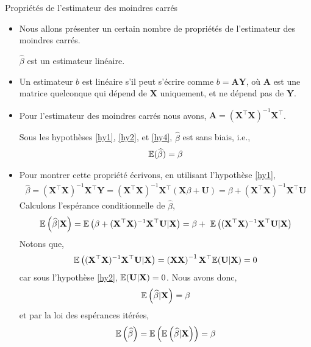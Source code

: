 \begin{frame}[allowframebreaks]{Propriétés de l'estimateur des moindres carrés}
\begin{itemize}
\item Nous allons présenter un certain nombre de propriétés de l'estimateur des moindres carrés.
\begin{proposition}$\widehat{\beta}$ est un estimateur linéaire.
\end{proposition}

\item Un estimateur $b$ est linéaire s'il peut s'écrire comme $b=\mathbf{A}\mathbf{Y}$, où $\mathbf{A}$ est une matrice quelconque qui dépend de $\mathbf{X}$ uniquement, et ne dépend pas de $\mathbf{Y}$.
\item  Pour l'estimateur des moindres carrés nous avons, $\mathbf{A} = (\mathbf{X}^\top\mathbf{X})^{-1}\mathbf{X}^\top$.

\begin{proposition}
Sous les hypothèses \ref{hy1}, \ref{hy2}, et \ref{hy4}, $\widehat{\beta}$ est sans biais, i.e.,
\begin{align*}
\mathbb{E}(\widehat{\beta}) = \beta
\end{align*}
\end{proposition}

\item Pour montrer cette propriété écrivons, en utilisant l'hypothèse \ref{hy1},
\begin{align*}
\widehat{\beta} = (\mathbf{X}^\top\mathbf{X})^{-1}\mathbf{X}^\top\mathbf{Y} =  (\mathbf{X}^\top\mathbf{X})^{-1}\mathbf{X}^\top (\mathbf{X}\beta + \mathbf{U}) = 
\beta + (\mathbf{X}^\top\mathbf{X})^{-1}\mathbf{X}^\top\mathbf{U}
\end{align*}
Calculons l'espérance conditionnelle de $\widehat{\beta}$,
\begin{align*}
\Er\left(\widehat{\beta} | \mathbf{X}\right) = \Er\left(\beta + (\mathbf{X}^\top\mathbf{X})^{-1}\mathbf{X}^\top\mathbf{U} | \mathbf{X}\right) = \beta +\ \Er\left((\mathbf{X}^\top\mathbf{X})^{-1}\mathbf{X}^\top\mathbf{U} | \mathbf{X}\right)
\end{align*}
Notons que,
\begin{align*}
\mathbb{E}\left((\mathbf{X}^\top\mathbf{X})^{-1}\mathbf{X}^\top\mathbf{U} | \mathbf{X}\right) = 
\left(\mathbf{X}\mathbf{X}\right)^{-1}\mathbf{X}^\top\mathbb{E}(\mathbf{U}|\mathbf{X}) = 0
\end{align*} 
car sous l'hypothèse \ref{hy2}, $\mathbb{E}(\mathbf{U}|\mathbf{X}) = 0$. Nous avons donc,
\begin{align}
\mathbb{E}\left(\widehat{\beta} | \mathbf{X}\right) = \beta
\label{eq13}
\end{align}
et par la loi des espérances itérées,
\begin{align*}
\mathbb{E}\left(\widehat{\beta}\right) = \mathbb{E}\left(\mathbb{E}\left(\widehat{\beta} | \mathbf{X}\right)\right)=\beta
\end{align*}


\end{itemize}
\end{frame}
